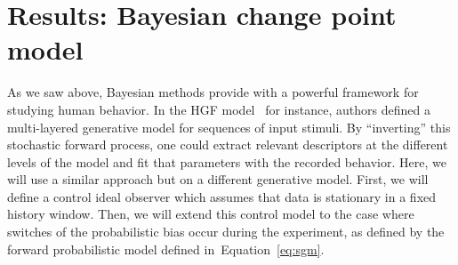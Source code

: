 \documentclass[profile,final,english, draft]{article}%
\newcommand{\citep}[1]{\parencite{#1}}
\newcommand{\seeEq}[1]{Equation~\ref{eq:#1}}
\begin{document}
\section{Results: Bayesian change point model}
\label{sec:bayesian_change_point}
%
%
As we saw above, Bayesian methods provide with
a powerful framework for studying human behavior.
In the HGF model~\citep{Matthys2011} for instance,
authors defined a multi-layered generative model for
sequences of input stimuli.
By ``inverting'' this stochastic forward process,
one could extract relevant descriptors at the different levels of the model
and fit that parameters with the recorded behavior.
Here, we will use a similar approach but on a different generative model.
First, we will define a control ideal observer
which assumes that data is stationary in a fixed history window.
Then, we will extend this control model to the case
where switches of the probabilistic bias occur during the experiment,
as defined by the forward probabilistic model defined in~\seeEq{sgm}.
%
\end{document}
